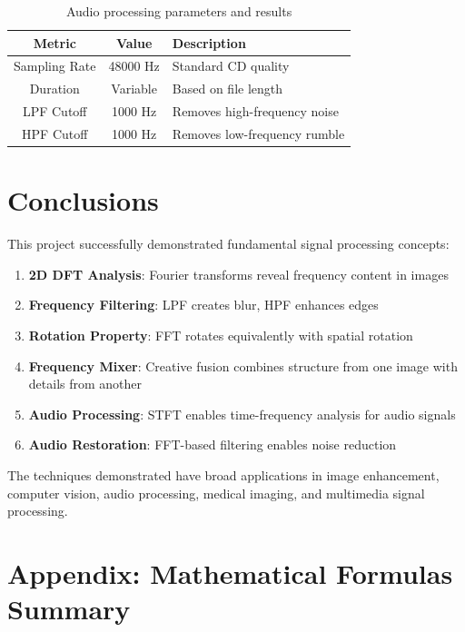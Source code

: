 \documentclass[12pt,a4paper]{article}
\begin{document}
\bigskip
\begin{table}[H]
    \centering
    \begin{tabular}{|c|c|p{5cm}|}
        \hline
        \textbf{Metric} & \textbf{Value} & \textbf{Description} \\
        \hline
        Sampling Rate & 48000 Hz & Standard CD quality \\
        \hline
        Duration & Variable & Based on file length \\
        \hline
        LPF Cutoff & 1000 Hz & Removes high-frequency noise \\
        \hline
        HPF Cutoff & 1000 Hz & Removes low-frequency rumble \\
        \hline
    \end{tabular}
    \caption{Audio processing parameters and results}
    \label{tab:audio_results}
\end{table}

\bigskip
\section{Conclusions}
This project successfully demonstrated fundamental signal processing concepts:

\bigskip
\begin{enumerate}
    \item \textbf{2D DFT Analysis}: Fourier transforms reveal frequency content in images
    \item \textbf{Frequency Filtering}: LPF creates blur, HPF enhances edges
    \item \textbf{Rotation Property}: FFT rotates equivalently with spatial rotation
    \item \textbf{Frequency Mixer}: Creative fusion combines structure from one image with details from another
    \item \textbf{Audio Processing}: STFT enables time-frequency analysis for audio signals
    \item \textbf{Audio Restoration}: FFT-based filtering enables noise reduction
\end{enumerate}

\bigskip
The techniques demonstrated have broad applications in image enhancement, computer vision, audio processing, medical imaging, and multimedia signal processing.

\bigskip
\section{Appendix: Mathematical Formulas Summary}
\end{document}
